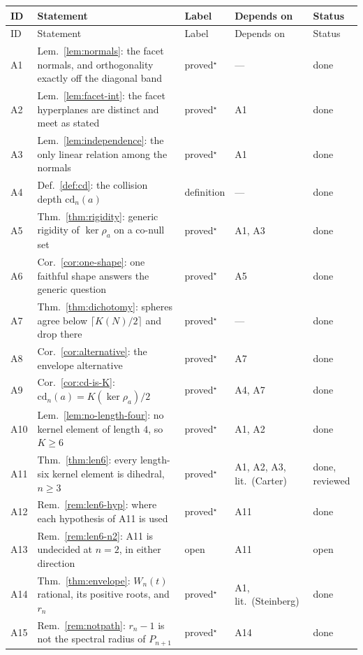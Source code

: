 \documentclass[11pt,a4paper]{article}
\newcommand{\cd}{\mathrm{cd}}
\theoremstyle{definition}
\theoremstyle{remark}
\theoremstyle{plain}
\begin{document}
\footnotesize
\begin{longtable}{@{}l p{} p{} p{} p{}@{}}
\toprule
ID & Statement & Label & Depends on & Status \\
\midrule
\endfirsthead
\toprule
ID & Statement & Label & Depends on & Status \\
\midrule
\endhead
A1  & Lem.~\ref{lem:normals}: the facet normals, and orthogonality exactly off the diagonal band & proved$^\star$ & --- & done \\
A2  & Lem.~\ref{lem:facet-int}: the facet hyperplanes are distinct and meet as stated & proved$^\star$ & A1 & done \\
A3  & Lem.~\ref{lem:independence}: the only linear relation among the normals & proved$^\star$ & A1 & done \\
A4  & Def.~\ref{def:cd}: the collision depth $\cd_n(a)$ & definition & --- & done \\
A5  & Thm.~\ref{thm:rigidity}: generic rigidity of $\ker\rho_a$ on a co-null set & proved$^\star$ & A1, A3 & done \\
A6  & Cor.~\ref{cor:one-shape}: one faithful shape answers the generic question & proved$^\star$ & A5 & done \\
A7  & Thm.~\ref{thm:dichotomy}: spheres agree below $\lceil K(N)/2\rceil$ and drop there & proved$^\star$ & --- & done \\
A8  & Cor.~\ref{cor:alternative}: the envelope alternative & proved$^\star$ & A7 & done \\
A9  & Cor.~\ref{cor:cd-is-K}: $\cd_n(a)=K(\ker\rho_a)/2$ & proved$^\star$ & A4, A7 & done \\
A10 & Lem.~\ref{lem:no-length-four}: no kernel element of length $4$, so $K\ge6$ & proved$^\star$ & A1, A2 & done \\
A11 & Thm.~\ref{thm:len6}: every length-six kernel element is dihedral, $n\ge3$ & proved$^\star$ & A1, A2, A3, lit.\ (Carter) & done, reviewed \\
A12 & Rem.~\ref{rem:len6-hyp}: where each hypothesis of A11 is used & proved$^\star$ & A11 & done \\
A13 & Rem.~\ref{rem:len6-n2}: A11 is undecided at $n=2$, in either direction & open & A11 & open \\
A14 & Thm.~\ref{thm:envelope}: $W_n(t)$ rational, its positive roots, and $r_n$ & proved$^\star$ & A1, lit.\ (Steinberg) & done \\
A15 & Rem.~\ref{rem:notpath}: $r_n-1$ is not the spectral radius of $P_{n+1}$ & proved$^\star$ & A14 & done \\

\end{longtable}
\end{document}
